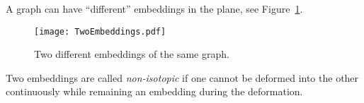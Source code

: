 
A graph can have ``different'' embeddings in the plane, see Figure~\ref{fig:TwoEmbeddings}.

\begin{figure}[ht]
\begin{center}
\texttt{[image: TwoEmbeddings.pdf]}
\end{center}
\caption{Two different embeddings of the same graph.}
\label{fig:TwoEmbeddings}
\end{figure}

Two embeddings are called \emph{non-isotopic} if one cannot be deformed into the other continuously
while remaining an embedding during the deformation.
